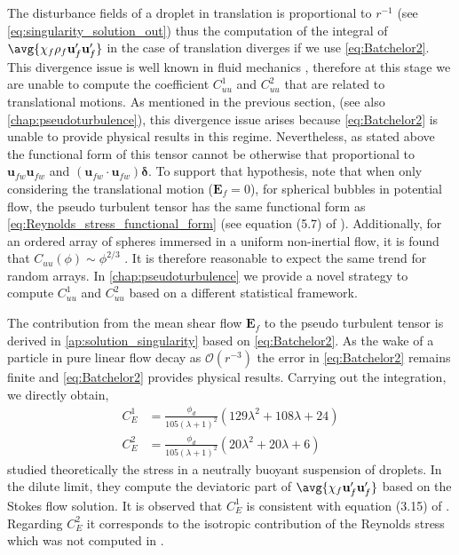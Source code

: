 The disturbance fields of a droplet in translation is proportional to $r^{-1}$ (see \ref{eq:singularity_solution_out}) thus the computation of the integral of $\avg{\chi_f \rho_f \textbf{u}_f' \textbf{u}_f'}$ in the case of translation diverges if we use \ref{eq:Batchelor2}.
This divergence issue is well known in fluid mechanics \citep{caflisch1985variance}, therefore at this stage we are unable to compute the coefficient $C_{uu}^1$ and $C_{uu}^2$ that are related to translational motions. 
As mentioned in the previous section, (see also \ref{chap:pseudoturbulence}), this divergence issue arises because \ref{eq:Batchelor2} is unable to provide physical results in this regime. 
Nevertheless, as stated above the functional form of this tensor cannot be otherwise that proportional to $\textbf{u}_{fw} \textbf{u}_{fw}$ and $(\textbf{u}_{fw}\cdot \textbf{u}_{fw})\bm\delta$.
To support that hypothesis, note that when only considering the translational motion ($\textbf{E}_f = 0$), for spherical bubbles in potential flow, the pseudo turbulent tensor has the same functional form as \ref{eq:Reynolds_stress_functional_form} (see equation (5.7) of \citet{zhang1994ensemble}). 
Additionally, for an ordered array of spheres immersed in a uniform non-inertial flow, it is found that $C_{uu}(\phi) \sim \phi^{2/3}$ \citet{hill2001first}.
It is therefore reasonable to expect the same trend for random arrays.
In \ref{chap:pseudoturbulence} we provide a novel strategy to compute $C_{uu}^1$ and $C_{uu}^2$ based on a different statistical framework. 


The contribution from the mean shear flow $\textbf{E}_f$ to the pseudo turbulent tensor is derived in \ref{ap:solution_singularity} based on \ref{eq:Batchelor2}. 
As the wake of a particle in pure linear flow decay as $\mathcal{O}(r^{-3})$ the error in \ref{eq:Batchelor2} remains finite and \ref{eq:Batchelor2} provides physical results. 
Carrying out the integration, we directly obtain, 
\begin{align}
    C_E^1  &= \frac{\phi_d}{105 (\lambda +1)^2 } (129\lambda^2+108\lambda+24)\\
    C_E^2 &= \frac{\phi_d}{105 (\lambda +1)^2 } (20\lambda^2 +20\lambda + 6)
\end{align}
\citet{raja2010inertial} studied theoretically the stress in a neutrally buoyant suspension of droplets. 
In the dilute limit, they compute the deviatoric part of $\avg{\chi_f \textbf{u}_f' \textbf{u}_f'}$ based on the Stokes flow solution. 
It is observed that $C_E^1$ is consistent with equation (3.15) of \citet{raja2010inertial}.
Regarding $C_E^2$ it corresponds to the isotropic contribution of the Reynolds stress which was not computed in \citet{raja2010inertial}.


